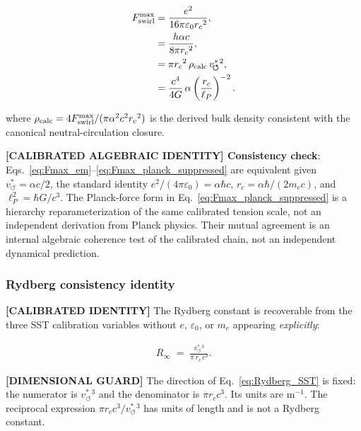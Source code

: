 \documentclass[11pt]{article}
\theoremstyle{definition}
\theoremstyle{plain}
\theoremstyle{remark}
\newcommand{\rc}{{r_c}}
\newcommand{\vchar}{v_{\!\boldsymbol{\circlearrowleft}}^{\ast}}
\begin{document}
        \begin{align}
            F_{\rm swirl}^{\max}
            &= \frac{e^2}{16\pi\varepsilon_0 \rc^2},
            \label{eq:Fmax_em}\\
            &= \frac{h\alpha c}{8\pi \rc^2},
            \label{eq:Fmax_hac}\\
            &= \pi \rc^2\,\rho_{\rm calc}\,\vchar{}^2,
            \label{eq:Fmax_rho}\\
            &= \frac{c^4}{4G}\,\alpha
            \left(\frac{\rc}{\ell_P}\right)^{-2}.
            \label{eq:Fmax_planck_suppressed}
        \end{align}

        where $\rho_{\rm calc} = 4F_{\rm swirl}^{\max}/(\pi\alpha^2 c^2 \rc^2)$ is the derived bulk density consistent with the canonical neutral-circulation closure.

        \textbf{[CALIBRATED ALGEBRAIC IDENTITY] Consistency check}: Eqs.~\eqref{eq:Fmax_em}--\eqref{eq:Fmax_planck_suppressed} are equivalent given $\vchar = \alpha c/2$, the standard identity $e^2/(4\pi\varepsilon_0) = \alpha\hbar c$, $\rc=\alpha\hbar/(2m_ec)$, and $\ell_P^2=\hbar G/c^3$. The Planck-force form in Eq.~\eqref{eq:Fmax_planck_suppressed} is a hierarchy reparameterization of the same calibrated tension scale, not an independent derivation from Planck physics. Their mutual agreement is an internal algebraic coherence test of the calibrated chain, not an independent dynamical prediction.

        \subsubsection{Rydberg consistency identity}

        \textbf{[CALIBRATED IDENTITY]} The Rydberg constant is recoverable from the three SST calibration variables without $e$, $\varepsilon_0$, or $m_e$ appearing \emph{explicitly}:

        \begin{align}
            R_\infty \;=\; \frac{\vchar{}^3}{\pi\,\rc\,c^3}.
            \label{eq:Rydberg_SST}
        \end{align}

        \textbf{[DIMENSIONAL GUARD]} The direction of Eq.~\eqref{eq:Rydberg_SST} is fixed: the numerator is $\vchar{}^3$ and the denominator is $\pi\rc c^3$. Its units are $\mathrm{m^{-1}}$. The reciprocal expression $\pi\rc c^3/\vchar{}^3$ has units of length and is not a Rydberg constant.
\end{document}
